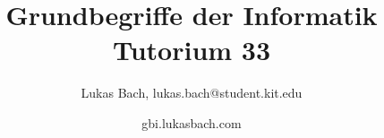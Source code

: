 \documentclass[handout]{beamer}
\title[Grundbegriffe der Informatik]{Grundbegriffe der Informatik\\Tutorium 33}
\subtitle{}
\author{Lukas Bach, lukas.bach@student.kit.edu}
\date{gbi.lukasbach.com}
\institute{Tutorium im Wintersemester 2016/2017}
\begin{document}
	
	
	\begin{frame}
		\titlepage
	\end{frame}
	
	
\def\compiletype{print}

%

\def\compileall{1}

















\end{document}
